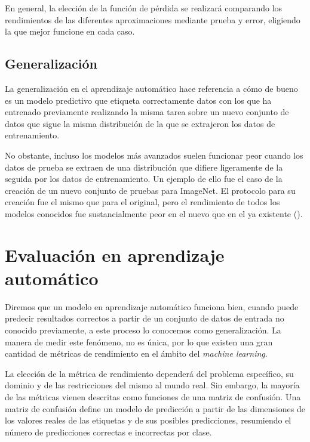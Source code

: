 \documentclass[oneside,openright,titlepage,numbers=noenddot,openany,headinclude,footinclude=true,
cleardoublepage=empty,abstractoff,BCOR=5mm,paper=a4,fontsize=12pt,main=spanish]{scrreprt}
\begin{document}
En general, la elección de la función de pérdida se realizará comparando los rendimientos de las diferentes aproximaciones mediante prueba y error, eligiendo la que mejor funcione en cada caso.

\subsection{Generalización}

La generalización en el aprendizaje automático hace referencia a cómo de bueno es un modelo predictivo que etiqueta correctamente datos con los que ha entrenado previamente realizando la misma tarea sobre un nuevo conjunto de datos que sigue la misma distribución de la que se extrajeron los datos de entrenamiento. %

No obstante, incluso los modelos más avanzados suelen funcionar peor cuando los datos de prueba se extraen de una distribución que difiere ligeramente de la seguida por los datos de entrenamiento. Un ejemplo de ello fue el caso de la creación de un nuevo conjunto de pruebas para ImageNet. El protocolo para su creación fue el mismo que para el original, pero el rendimiento de todos los modelos conocidos fue sustancialmente peor en el nuevo que en el ya existente (\cite{generalize2019}).

\section{Evaluación en aprendizaje automático}

\label{sec:evalaa}

Diremos que un modelo en aprendizaje automático funciona bien, cuando puede predecir resultados correctos a partir de un conjunto de datos de entrada no conocido previamente, a este proceso lo conocemos como generalización. La manera de medir este fenómeno, no es única, por lo que existen una gran cantidad de métricas de rendimiento en el ámbito del \textit{machine learning}. 

La elección de la métrica de rendimiento dependerá del problema específico, su dominio y de las restricciones del mismo al mundo real. Sin embargo, la mayoría de las métricas vienen descritas como funciones de una matriz de confusión. Una matriz de confusión define un modelo de predicción a partir de las dimensiones de los valores reales de las etiquetas y de sus posibles predicciones, resumiendo el número de predicciones correctas e incorrectas por clase.\\
\end{document}
